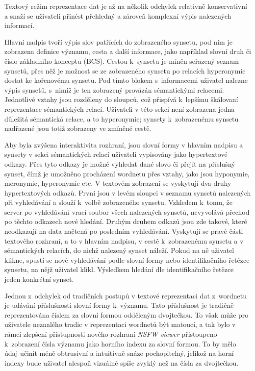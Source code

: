 \documentclass[a4paper, 11pt, oneside, showtrims]{book}
\newcommand{\simplywn}{\textit{NSFW viewer} }
\begin{document}
				Textový režim reprezentace dat je až na několik odchylek relativně konservativní a snaží se uživateli přinést přehledný a zároveň komplexní výpis nalezených informací. 

				Hlavní nadpis tvoří výpis slov patřících do zobrazeného synsetu, pod ním je zobrazena definice významu, cesta a další informace, jako například slovní druh či číslo základního konceptu (BCS). Cestou k~synsetu je míněn seřazený seznam synsetů, přes něž je možnost se ze zobrazeného synsetu po relacích hyperonymie dostat ke kořenovému synsetu. Pod tímto blokem s~informacemi uživatel nalezne výpis synsetů, s~nimiž je ten zobrazený provázán sémantickými relacemi. Jednotlivé vztahy jsou rozděleny do sloupců, což přispívá k~lepšímu škálovaní reprezentace sémantických relací. Uživateli v této sekci není zobrazena jedna důležitá sémantická relace, a to hyperonymie; synsety k~zobrazenému synsetu nadřazené jsou totiž zobrazeny ve zmíněné cestě.

				Aby byla zvýšena interaktivita rozhraní, jsou slovní formy v hlavním nadpisu a synsety v sekci sémantických relací uživateli vypisovány jako hypertextové odkazy. Přes tyto odkazy je možné vyhledat dané slovo či přejít na příslušný synset, čímž je umožněno procházení wordnetu přes vztahy, jako jsou hyponymie, meronymie, hyperonymie etc. V textovém zobrazení se vyskytují dva druhy hypertextových odkazů. První jsou v levém sloupci v seznamu synsetů nalezených při vyhledávání a slouží k~volbě zobrazeného synsetu. Vzhledem k~tomu, že server po vyhledávání vrací soubor všech nalezených synsetů, nevyvolává přechod po těchto odkazech nové hledání. Druhým druhem odkazů jsou zde takové, které neodkazují na data načtená po posledním vyhledávání. Vyskytují se pravé části textového rozhraní, a to v hlavním nadpisu, v cestě k~zobrazenému synsetu a v sémantických relacích, do nichž nalezený synset náleží. Pokud na ně uživatel klikne, spustí se nové vyhledávání podle slovní formy nebo identifikačního řetězce synsetu, na nějž uživatel klikl. Výsledkem hledání dle identifikačního řetězce jeden konkrétní synset.

				Jednou z~odchylek od tradičních postupů v textové reprezentaci dat z~wordnetu je udávání příslušnosti slovní formy k~významu. Tato příslušnost je tradičně reprezentována číslem za slovní formou odděleným dvojtečkou. To však může pro uživatele neznalého tradic v reprezentaci wordnetů být matoucí, a tak bylo v rámci zlepšení přístupnosti nového rozhraní \simplywn přistoupeno k~zobrazení čísla významu jako horního indexu za slovní formou. To by mělo údaj učinit méně obtrusivní a intuitivně snáze pochopitelný, jelikož na horní indexy bude uživatel alespoň vizuálně spíše zvyklý než na čísla za dvojtečkou.
\end{document}
